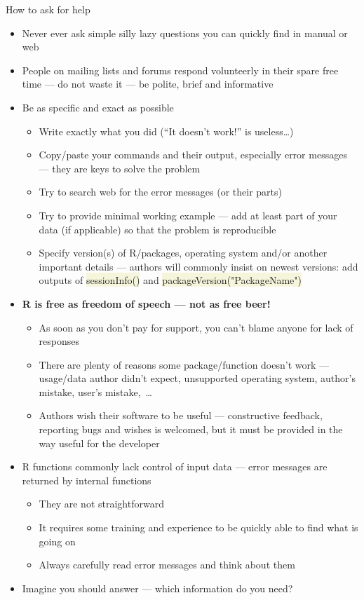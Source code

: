 \documentclass[compress, ucs, xelatex, 11pt, xcolor=svgnames, aspectratio=169,
	hyperref={
		bookmarks=true,
		unicode=true,
		colorlinks=true,
		pdftitle={Molecular data in R},
		plainpages=false,
		pdfauthor={Vojtech Zeisek},
		pdfsubject={Course about phylogeny and evolution in R},
		pdfcreator={XeLaTeX},
		pdfkeywords={R, evolution, phylogeny, molecular data},
		linkcolor=Crimson, %
		anchorcolor=Magenta, %
		citecolor=Magenta, %
		filecolor=Magenta, %
		menucolor=Magenta, %
		urlcolor=DodgerBlue, %
		pdftex},
	url={hyphens, lowtilde} %
	]{beamer}
\renewcommand{\texttt}[1]{\colorbox{Beige}{{\ttfamily #1}}}
\begin{document}
\begin{frame}[allowframebreaks]{How to ask for help}
	\label{howtoask}
	\begin{itemize}
		\item \alert{Never ever} ask simple silly lazy questions you can quickly find in manual or web
		\item People on mailing lists and forums respond volunteerly in their spare free time --- do not waste it --- be polite, brief and informative
		\item Be as specific and exact as possible
		\begin{itemize}
			\item Write \alert{exactly} what you did (\enquote{It doesn't work!} is useless\ldots)
			\item Copy/paste your commands and their output, especially error messages --- they are keys to solve the problem
			\item Try to search web for the error messages (or their parts)
			\item Try to provide minimal working example --- add at least part of your data (if applicable) so that the problem is reproducible
			\item Specify version(s) of R/packages, operating system and/or another important details --- authors will commonly insist on newest versions: add outputs of \texttt{sessionInfo()} and \texttt{packageVersion("PackageName")}
		\end{itemize}
		\item \textbf{R is free as freedom of speech --- not as free beer!}
		\begin{itemize}
			\item As soon as you don't pay for support, you can't blame anyone for lack of responses
			\item There are plenty of reasons some package/function doesn't work --- usage/data author didn't expect, unsupported operating system, author's mistake, user's mistake,~\ldots
			\item Authors wish their software to be useful --- constructive feedback, reporting bugs and wishes is welcomed, but it must be provided in the way useful for the developer
		\end{itemize}
		\item R functions commonly lack control of input data --- error messages are returned by internal functions
		\begin{itemize}
			\item They are not straightforward
			\item It requires some training and experience to be quickly able to find what is going on
			\item Always carefully read error messages and think about them
		\end{itemize}
		\item Imagine you should answer --- which information do you need?
	\end{itemize}
\end{frame}
\end{document}
